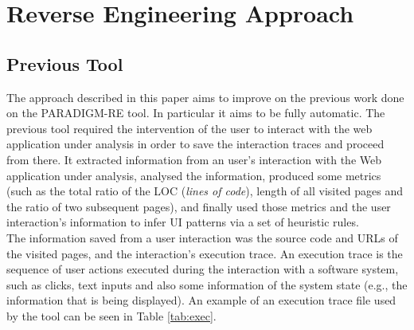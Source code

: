 \documentclass[conference]{IEEEtran}
\begin{document}
\section{Reverse Engineering Approach}\label{sec:re}

\subsection{Previous Tool}\label{sec:prev}

The  approach described in this paper aims to improve on the previous work \cite{nabuco2013inferring} done on the PARADIGM-RE tool. In particular it aims to be fully automatic. The previous tool required the intervention of the user to interact with the web application under analysis in order to save the interaction traces and proceed from there. It extracted information from an user's interaction with the Web application under analysis, analysed the information, produced some metrics (such as the total ratio of the LOC (\textit{lines of code}), length of all visited pages and the ratio of two subsequent pages), and finally used those metrics and the user interaction's information to infer UI patterns via a set of heuristic rules. \\

The information saved from a user interaction was the source code and URLs of the visited pages, and the interaction's execution trace. An execution trace is the sequence of user actions executed during the interaction with a software system, such as clicks, text inputs and also some information of the system state (e.g., the information that is being displayed). An example of an execution trace file used by the tool can be seen in Table \ref{tab:exec}.\\
\end{document}
